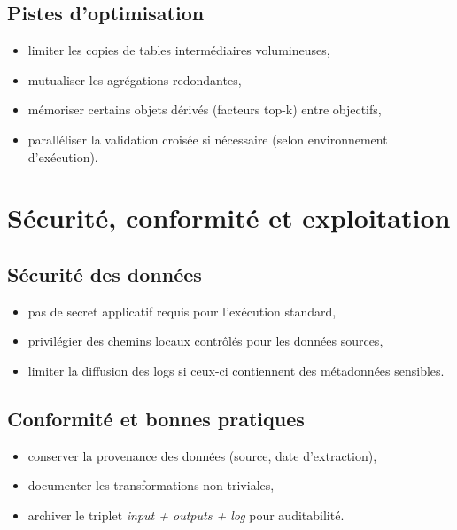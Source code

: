 \documentclass[11pt,a4paper]{article}
\begin{document}
\subsection{Pistes d'optimisation}
\begin{itemize}[leftmargin=1.2cm]
  \item limiter les copies de tables interm\'ediaires volumineuses,
  \item mutualiser les agr\'egations redondantes,
  \item m\'emoriser certains objets d\'eriv\'es (facteurs top-k) entre objectifs,
  \item parall\'eliser la validation crois\'ee si n\'ecessaire (selon environnement d'ex\'ecution).
\end{itemize}

\section{S\'ecurit\'e, conformit\'e et exploitation}
\subsection{S\'ecurit\'e des donn\'ees}
\begin{itemize}[leftmargin=1.2cm]
  \item pas de secret applicatif requis pour l'ex\'ecution standard,
  \item privil\'egier des chemins locaux contrôl\'es pour les donn\'ees sources,
  \item limiter la diffusion des logs si ceux-ci contiennent des m\'etadonn\'ees sensibles.
\end{itemize}

\subsection{Conformit\'e et bonnes pratiques}
\begin{itemize}[leftmargin=1.2cm]
  \item conserver la provenance des donn\'ees (source, date d'extraction),
  \item documenter les transformations non triviales,
  \item archiver le triplet \textit{input + outputs + log} pour auditabilit\'e.
\end{itemize}
\end{document}
